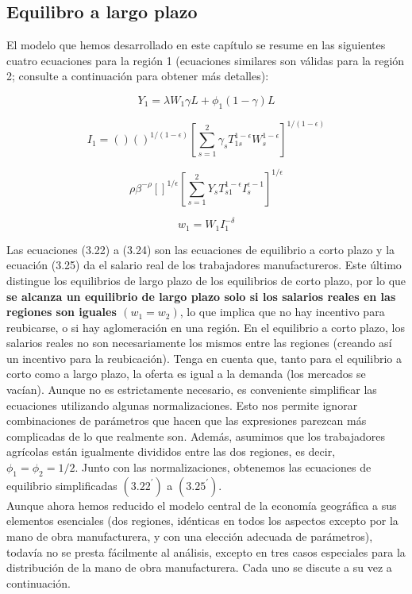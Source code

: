\subsection{Equilibro a largo plazo}

El modelo que hemos desarrollado en este capítulo se resume en las siguientes cuatro ecuaciones para la región 1 (ecuaciones similares son válidas para la región 2; consulte a continuación para obtener más detalles):

\begin{equation}
    Y_1 = \lambda W_1\gamma L + \phi_1(1-\gamma)L
\end{equation}

\begin{equation}
    I_1 = \left(\right)\left(\right)^{1/(1-\epsilon)}\left[\sum_{s=1}^2 \gamma_s T_{1s}^{1-\epsilon}W_s^{1-\epsilon}\right]^{1/(1-\epsilon)}
\end{equation}

\begin{equation}
    \rho \beta^{-\rho}\left[\right]^{1/\epsilon}\left[\sum_{s=1}^2 Y_s T_{s1}^{1-\epsilon}I_s^{\epsilon-1}\right]^{1/\epsilon}
\end{equation}

\begin{equation}
    w_1 = W_1 I^{-\delta}_{1}
\end{equation}

Las ecuaciones (3.22) a (3.24) son las ecuaciones de equilibrio a corto plazo y la ecuación (3.25) da el salario real de los trabajadores manufactureros. Este último distingue los equilibrios de largo plazo de los equilibrios de corto plazo, por lo que \textbf{se alcanza un equilibrio de largo plazo solo si los salarios reales en las regiones son iguales $(w_1 = w_2)$}, lo que implica que no hay incentivo para reubicarse, o si hay aglomeración en una región. En el equilibrio a corto plazo, los salarios reales no son necesariamente los mismos entre las regiones (creando así un incentivo para la reubicación). Tenga en cuenta que, tanto para el equilibrio a corto como a largo plazo, la oferta es igual a la demanda (los mercados se vacían). 
Aunque no es estrictamente necesario, es conveniente simplificar las ecuaciones utilizando algunas normalizaciones. Esto nos permite ignorar combinaciones de parámetros que hacen que las expresiones parezcan más complicadas de lo que realmente son.  Además, asumimos que los trabajadores agrícolas están igualmente divididos entre las dos regiones, es decir, $\phi_1 = \phi_2 = 1/2$. Junto con las normalizaciones, obtenemos las ecuaciones de equilibrio simplificadas $(3.22^{'})$ a $(3.25^{'})$.\\
Aunque ahora hemos reducido el modelo central de la economía geográfica a sus elementos esenciales (dos regiones, idénticas en todos los aspectos excepto por la mano de obra manufacturera, y con una elección adecuada de parámetros), todavía no se presta fácilmente al análisis, excepto en tres casos especiales para la distribución de la mano de obra manufacturera. Cada uno se discute a su vez a continuación.\\

